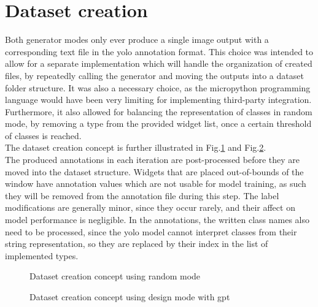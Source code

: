 \documentclass[Bachelor, BIC, english, fhCitStyle, IEEE]{BASE/twbook} %
\begin{document}
\section{Dataset creation}
Both generator modes only ever produce a single image output with a corresponding text file in the \ac{yolo} annotation format. This choice was intended to allow for a separate implementation which will handle the organization of created files, by repeatedly calling the generator and moving the outputs into a dataset folder structure. It was also a necessary choice, as the micropython programming language would have been very limiting for implementing third-party integration.\\
Furthermore, it also allowed for balancing the representation of classes in random mode, by removing a type from the provided widget list, once a certain threshold of classes is reached.\\
The dataset creation concept is further illustrated in Fig.\ref{fig:dataset-creation-random} and Fig.\ref{fig:dataset-creation-design}.\\
The produced annotations in each iteration are post-processed before they are moved into the dataset structure. Widgets that are placed out-of-bounds of the window have annotation values which are not usable for model training, as such they will be removed from the annotation file during this step. The label modifications are generally minor, since they occur rarely, and their affect on model performance is negligible. In the annotations, the written class names also need to be processed, since the \ac{yolo} model cannot interpret classes from their string representation, so they are replaced by their index in the list of implemented types.
\begin{figure}[!htbp]
    \caption{Dataset creation concept using random mode}
    \centering
    
    \label{fig:dataset-creation-random}
\end{figure}
\begin{figure}[!htbp]
    \caption{Dataset creation concept using design mode with gpt}
    \centering
    
    \label{fig:dataset-creation-design}
\end{figure}
\clearpage
\end{document}

